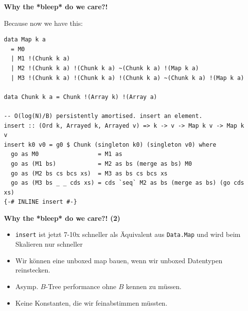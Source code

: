 \documentclass{beamer}
\begin{document}

\begin{frame}[fragile]

\textbf{Why the *bleep* do we care?!}
\pause
\bigskip

Because now we have this:

\begin{verbatim}
data Map k a
  = M0 
  | M1 !(Chunk k a) 
  | M2 !(Chunk k a) !(Chunk k a) ~(Chunk k a) !(Map k a)
  | M3 !(Chunk k a) !(Chunk k a) !(Chunk k a) ~(Chunk k a) !(Map k a)
  
data Chunk k a = Chunk !(Array k) !(Array a)

-- O(log(N)/B) persistently amortised. insert an element.
insert :: (Ord k, Arrayed k, Arrayed v) => k -> v -> Map k v -> Map k v
insert k0 v0 = g0 $ Chunk (singleton k0) (singleton v0) where
  go as M0                 = M1 as
  go as (M1 bs)            = M2 as bs (merge as bs) M0
  go as (M2 bs cs bcs xs)  = M3 as bs cs bcs xs
  go as (M3 bs _ _ cds xs) = cds `seq` M2 as bs (merge as bs) (go cds xs)
{-# INLINE insert #-}
\end{verbatim}

\end{frame}

\begin{frame}
\textbf{Why the *bleep* do we care?! (2)}
\pause
\bigskip

\begin{itemize}
\item \texttt{insert} ist jetzt 7-10x schneller als Äquivalent aus \texttt{Data.Map} und wird beim Skalieren nur schneller\pause
\item Wir können eine unboxed map bauen, wenn wir unboxed Datentypen reinstecken.\pause
\item Asymp. $B$-Tree performance ohne $B$ kennen zu müssen.\pause
\item Keine Konstanten, die wir feinabstimmen müssten.
\end{itemize}
\end{frame}

\end{document}

